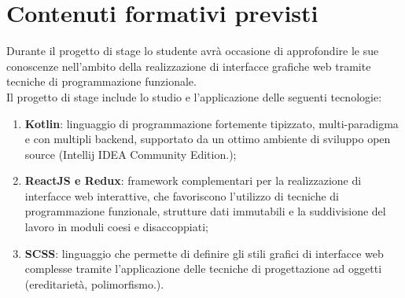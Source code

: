 \section*{Contenuti formativi previsti}
Durante il progetto di stage lo studente avrà occasione di approfondire le sue conoscenze nell’ambito della realizzazione di interfacce grafiche web tramite tecniche di programmazione funzionale.\\
Il progetto di stage include lo studio e l'applicazione delle seguenti tecnologie:
\begin{enumerate}
	\item \textbf{Kotlin}: linguaggio di programmazione fortemente tipizzato, multi-paradigma e con multipli backend, supportato da un ottimo ambiente di sviluppo open source (Intellij IDEA Community Edition.);
	\item \textbf{ReactJS e Redux}: framework complementari per la realizzazione di interfacce web interattive, che favoriscono l'utilizzo di tecniche di programmazione funzionale, strutture dati immutabili e la suddivisione del lavoro in moduli coesi e disaccoppiati;
	\item \textbf{SCSS}: linguaggio che permette di definire gli stili grafici di interfacce web complesse tramite l'applicazione delle tecniche di progettazione ad oggetti (ereditarietà, polimorfismo.).
\end{enumerate}
